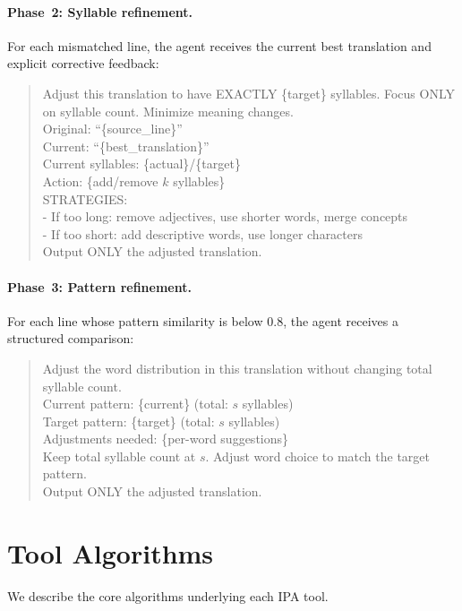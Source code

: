 \documentclass[11pt]{article}
\begin{document}
\paragraph{Phase~2: Syllable refinement.}
For each mismatched line, the agent receives the current best translation and explicit corrective feedback:
\begin{quote}
\small\ttfamily
Adjust this translation to have EXACTLY \{target\} syllables.
Focus ONLY on syllable count. Minimize meaning changes.\\[4pt]
Original: ``\{source\_line\}''\\
Current: ``\{best\_translation\}''\\
Current syllables: \{actual\}/\{target\}\\
Action: \{add/remove $k$ syllables\}\\[4pt]
STRATEGIES:\\
- If too long: remove adjectives, use shorter words, merge concepts\\
- If too short: add descriptive words, use longer characters\\[4pt]
Output ONLY the adjusted translation.
\end{quote}

\paragraph{Phase~3: Pattern refinement.}
For each line whose pattern similarity is below 0.8, the agent receives a structured comparison:
\begin{quote}
\small\ttfamily
Adjust the word distribution in this translation without changing total syllable count.\\[4pt]
Current pattern: \{current\} (total: $s$ syllables)\\
Target pattern: \{target\} (total: $s$ syllables)\\[4pt]
Adjustments needed: \{per-word suggestions\}\\[4pt]
Keep total syllable count at $s$. Adjust word choice to match the target pattern.\\[4pt]
Output ONLY the adjusted translation.
\end{quote}

\section{Tool Algorithms}
\label{app:tools}

We describe the core algorithms underlying each IPA tool.
\end{document}
